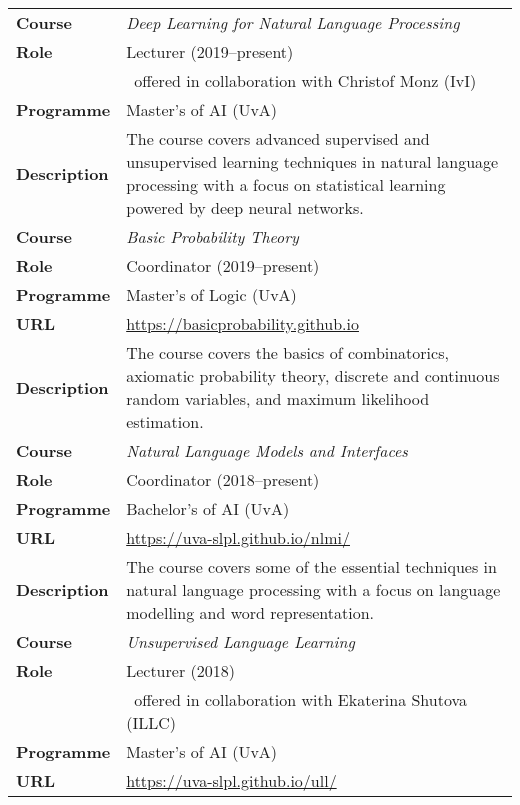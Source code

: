 \begin{center}
\begin{tabular}{l p{}} 
    \toprule
{\bf Course} & {\it Deep Learning for Natural Language Processing} \\
{\bf Role}   & Lecturer (2019--present) \\
 & ~offered in collaboration with Christof Monz (IvI)\\
{\bf Programme} & Master's of AI (UvA)\\
{\bf Description} & The course covers advanced supervised and unsupervised learning techniques in natural language processing with a focus on statistical learning powered by deep neural networks.
\\ \midrule
{\bf Course} & {\it Basic Probability Theory} \\
{\bf Role}   & Coordinator (2019--present) \\
{\bf Programme} & Master's of Logic (UvA)\\
{\bf URL} & \url{https://basicprobability.github.io} \\
{\bf Description} & The course covers the basics of combinatorics, axiomatic probability theory, discrete and continuous random variables, and maximum likelihood estimation. 
\\ \midrule
{\bf Course} & {\it Natural Language Models and Interfaces} \\
{\bf Role}   & Coordinator (2018--present) \\
{\bf Programme} & Bachelor's of AI (UvA)\\
{\bf URL} & \url{https://uva-slpl.github.io/nlmi/} \\
{\bf Description} & The course covers some of the essential techniques in natural language processing with a focus on language modelling and word representation.
\\ \midrule
{\bf Course} & {\it Unsupervised Language Learning} \\
{\bf Role}   & Lecturer (2018) \\
 & ~offered in collaboration with Ekaterina Shutova (ILLC)\\
{\bf Programme} & Master's of AI (UvA)\\
{\bf URL} & \url{https://uva-slpl.github.io/ull/} \\

\end{tabular}
\end{center}
